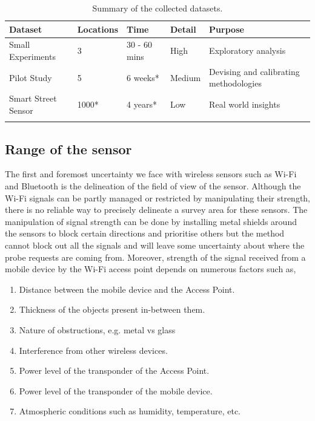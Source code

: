 \begin{table}
  \footnotesize
  \begin{center}
    \begin{tabular}{llllp{3cm}}
      \toprule
      Dataset & Locations & Time & Detail & Purpose\\
      \midrule
      \addlinespace[0.1cm]
      Small Experiments & 3 & 30 - 60 mins & High & Exploratory analysis\\
      \addlinespace[0.2cm]
      Pilot Study & 5 & 6 weeks* & Medium & Devising and calibrating methodologies\\
      \addlinespace[0.2cm]
      Smart Street Sensor & 1000* & 4 years* & Low & Real world insights\\
      \addlinespace[0.1cm]
      \bottomrule
    \end{tabular}
  \end{center}
  \caption{Summary of the collected datasets.}
  \label{table:collection:discussion:summary}
\end{table}


\subsection{Range of the sensor}
The first and foremost uncertainty we face with wireless sensors such as Wi-Fi and Bluetooth is the delineation of the field of view of the sensor.
Although the Wi-Fi signals can be partly managed or restricted by manipulating their strength, there is no reliable way to precisely delineate a survey area for these sensors. 
The manipulation of signal strength can be done by installing metal shields around the sensors to block certain directions and prioritise others but the method cannot block out all the signals and will leave some uncertainty about where the probe requests are coming from.
Moreover, strength of the signal received from a mobile device by the Wi-Fi access point depends on numerous factors such as,

\begin{enumerate}
  \setlength{\itemindent}{2em}
  \itemsep-0.5em
  \item Distance between the mobile device and the Access Point.
  \item Thickness of the objects present in-between them.
  \item Nature of obstructions, e.g. metal vs glass
  \item Interference from other wireless devices.
  \item Power level of the transponder of the Access Point.
  \item Power level of the transponder of the mobile device.
  \item Atmospheric conditions such as humidity, temperature, etc.
\end{enumerate}

